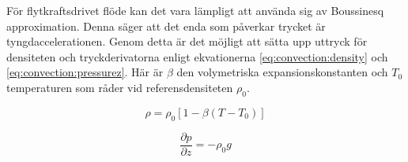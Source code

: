 För flytkraftsdrivet flöde kan det vara lämpligt att använda sig av
Boussinesq approximation. Denna säger att det enda som påverkar trycket är
tyngdaccelerationen. Genom detta är det möjligt att sätta upp uttryck för densiteten
och tryckderivatorna enligt ekvationerna \eqref{eq:convection:density}
och \eqref{eq:convection:pressurez}. Här är
$\beta$ den volymetriska expansionskonstanten och
$T_0$ temperaturen som råder vid referensdensiteten $\rho_0$.

\begin{equation}
\label{eq:convection:density}
\rho = \rho_0[1-\beta(T-T_0)]
\end{equation}

\begin{equation}
\label{eq:convection:pressurez}
\frac{\partial p}{\partial z} = -\rho_0g
\end{equation}


